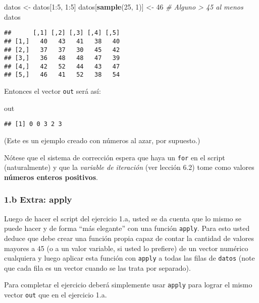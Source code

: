 \documentclass[]{article}
\newenvironment{Shaded}{}{}
\newcommand{\KeywordTok}[1]{\textcolor[rgb]{0.00,0.44,0.13}{\textbf{{#1}}}}
\newcommand{\DecValTok}[1]{\textcolor[rgb]{0.25,0.63,0.44}{{#1}}}
\newcommand{\CommentTok}[1]{\textcolor[rgb]{0.38,0.63,0.69}{\textit{{#1}}}}
\newcommand{\NormalTok}[1]{{#1}}
\begin{document}
\begin{Shaded}
\begin{Highlighting}[]
\NormalTok{datos <- datos[}\DecValTok{1}\NormalTok{:}\DecValTok{5}\NormalTok{, }\DecValTok{1}\NormalTok{:}\DecValTok{5}\NormalTok{]}
\NormalTok{datos[}\KeywordTok{sample}\NormalTok{(}\DecValTok{25}\NormalTok{, }\DecValTok{1}\NormalTok{)] <- }\DecValTok{46}  \CommentTok{# Alguno > 45 al menos}
\NormalTok{datos}
\end{Highlighting}
\end{Shaded}
\begin{verbatim}
##      [,1] [,2] [,3] [,4] [,5]
## [1,]   40   43   41   38   40
## [2,]   37   37   30   45   42
## [3,]   36   48   48   47   39
## [4,]   42   52   44   43   47
## [5,]   46   41   52   38   54
\end{verbatim}
Entonces el vector \texttt{out} será así:

\begin{Shaded}
\begin{Highlighting}[]
\NormalTok{out}
\end{Highlighting}
\end{Shaded}
\begin{verbatim}
## [1] 0 0 3 2 3
\end{verbatim}
(Este es un ejemplo creado con números al azar, por supuesto.)

Nótese que el sistema de corrección espera que haya un \texttt{for} en
el script (naturalmente) y que la \emph{variable de iteración} (ver
lección 6.2) tome como valores \textbf{números enteros positivos}.

\subsubsection{1.b Extra: apply}

Luego de hacer el script del ejercicio 1.a, usted se da cuenta que lo
mismo se puede hacer y de forma ``más elegante'' con una función
\texttt{apply}. Para esto usted deduce que debe crear una función propia
capaz de contar la cantidad de valores mayores a 45 (o a un valor
variable, si usted lo prefiere) de un vector numérico cualquiera y luego
aplicar esta función con \texttt{apply} a todas las filas de
\texttt{datos} (note que cada fila es un vector cuando se las trata por
separado).

Para completar el ejercicio deberá simplemente usar \texttt{apply} para
lograr el mismo vector \texttt{out} que en el ejercicio 1.a.
\end{document}
